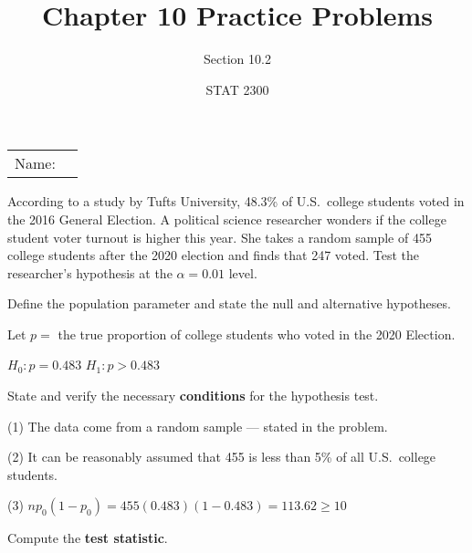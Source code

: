 \documentclass[noanswers]{exam}
\title{Chapter 10 Practice Problems}
\author{Section 10.2}
\date{STAT 2300}
\begin{document}
\noindent\begin{tabular}{@{}p{.3in}p{3in}@{}}
Name: & \hrulefill
\end{tabular}

\vspace{4mm}

\noindent According to a study by Tufts University, 48.3\% of U.S.\ college students voted in the 2016 General Election. A political science researcher wonders if the college student voter turnout is higher this year. She takes a random sample of 455 college students after the 2020 election and finds that 247 voted. Test the researcher's hypothesis at the $\alpha=0.01$ level.

\begin{questions} 

\vspace{1mm}

\question Define the population parameter and state the null and alternative hypotheses.

\begin{solution}[\stretch{1}]

\vspace{1mm}

Let $p=$ the true proportion of college students who voted in the 2020 Election.

\vspace{3mm}

$H_0:p=0.483$
$H_1:p>0.483$

\vspace{1mm}

\end{solution}

\question State and verify the necessary \textbf{conditions} for the hypothesis test.

\begin{solution}[\stretch{1}]

\vspace{1mm}

(1) The data come from a random sample --- stated in the problem.

(2) It can be reasonably assumed that 455 is less than 5\% of all U.S.\ college students.

(3) $np_0(1-p_0)=455(0.483)(1-0.483)=113.62\geq 10$

\vspace{1mm}

\end{solution}

\question Compute the \textbf{test statistic}.


\end{questions}
\end{document}
